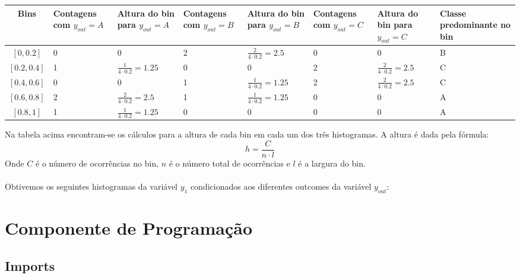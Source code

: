 \documentclass{article}
\begin{document}
\begin{table}[H]
\centering
\begin{tabular}{|c|w{1.8cm}|w{1.8cm}|w{1.8cm}|w{1.8cm}|w{1.8cm}|w{1.8cm}|w{1.8cm}|}
\hline
Bins & Contagens com $y_{out} = A$ & Altura do bin para $y_{out} = A$ & Contagens com $y_{out} = B$ & Altura do bin para $y_{out} = B$ & Contagens com $y_{out} = C$ & Altura do bin para $y_{out} = C$ & Classe predominante no bin \\ \hline
$[0,0.2]$       &  0             & 0                              & 2 & $\frac{2}{4\cdot 0.2} = 2.5$    & 0 & 0                   & B \\ \hline
$[0.2,0.4]$     &  1             & $\frac{1}{4 \cdot 0.2} = 1.25$ & 0 & 0                               & 2 & $\frac{2}{4\cdot 0.2} = 2.5$ & C \\ \hline
$[0.4,0.6]$     &  0             & 0                              & 1 & $\frac{1}{4\cdot 0.2} = 1.25$   & 2 & $\frac{2}{4\cdot 0.2} = 2.5$ & C \\ \hline
$[0.6,0.8]$     &  2             & $\frac{2}{4\cdot 0.2}=2.5$     & 1 & $\frac{1}{4\cdot 0.2} = 1.25$   & 0 & 0                   & A \\ \hline
$[0.8,1]$       &  1             & $\frac{1}{4\cdot 0.2} = 1.25$  & 0 & 0                               & 0 & 0                   & A \\ \hline
\end{tabular}
\end{table}

Na tabela acima encontram-se os cálculos para a altura de cada bin em cada um dos três histogramas. 
A altura é dada pela fórmula:
\[ h = \frac{C}{n\cdot l} \]
Onde $C$ é o número de ocorrências no bin, $n$ é o número total de ocorrências e $l$ é a largura do bin.

\paragraph{}

Obtivemos os seguintes histogramas da variável $y_1$ condicionados aos diferentes outcomes da variável $y_{out}$:



\newpage

\section{Componente de Programação}

\subsection{Imports}
\end{document}
